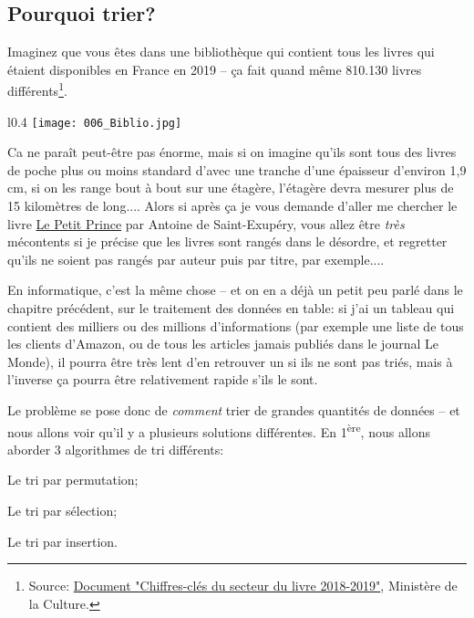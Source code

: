 \documentclass[12pt]{article}
\begin{document}
	\subsection{Pourquoi trier?}
	Imaginez que vous êtes dans une bibliothèque qui contient tous les livres qui étaient disponibles en France en 2019 -- ça fait quand même 810.130 livres différents\footnote{Source: \href{https://www.culture.gouv.fr/content/download/268286/3121285?v=1}{Document "Chiffres-clés du secteur du livre 2018-2019"}, Ministère de la Culture.}.
	\begin{wrapfigure}{l}{0.4\textwidth}
		\vspace{10pt} %
		\texttt{[image: 006\_Biblio.jpg]}
	\end{wrapfigure}
	
	Ca ne paraît peut-être pas énorme, mais si on imagine qu'ils sont tous des livres de poche plus ou moins standard d'avec une tranche d'une épaisseur d'environ 1,9 cm, si on les range bout à bout sur une étagère, l'étagère devra mesurer plus de 15 kilomètres de long.... Alors si après ça je vous demande d'aller me chercher le livre \uline{Le Petit Prince} par Antoine de Saint-Exupéry, vous allez être \textit{très} mécontents si je précise que les livres sont rangés dans le désordre, et regretter qu'ils ne soient pas rangés par auteur puis par titre, par exemple.... 
	
	En informatique, c'est la même chose -- et on en a déjà un petit peu parlé dans le chapitre précédent, sur le traitement des données en table: si j'ai un tableau qui contient des milliers ou des millions d'informations (par exemple une liste de tous les clients d'Amazon, ou de tous les articles jamais publiés dans le journal Le Monde), il pourra être très lent d'en retrouver un si ils ne sont pas triés, mais à l'inverse ça pourra être relativement rapide s'ils le sont.
	
	Le problème se pose donc de \textit{comment} trier de grandes quantités de données -- et nous allons voir qu'il y a plusieurs solutions différentes. En 1\textsuperscript{ère}, nous allons aborder 3 algorithmes de tri différents:
	\begin{alphenum}
		\item Le tri par permutation;
		\item Le tri par sélection;
		\item Le tri par insertion.
	\end{alphenum}
	
\end{document}

